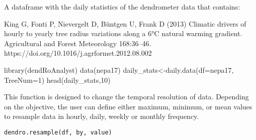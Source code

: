 \documentclass[a4paper]{book}
\begin{document}
%
\begin{Value}
A dataframe with the daily statistics of the dendrometer data that contains:

\end{Value}
%
\begin{References}\relax
King G, Fonti P, Nievergelt D, Büntgen U, Frank D (2013) Climatic drivers of hourly to yearly tree radius variations along a 6°C natural warming gradient. Agricultural and Forest Meteorology 168:36–46. https://doi.org/10.1016/j.agrformet.2012.08.002
\end{References}
%
\begin{Examples}
\begin{ExampleCode}
library(dendRoAnalyst)
data(nepa17)
daily_stats<-daily.data(df=nepa17, TreeNum=1)
head(daily_stats,10)

\end{ExampleCode}
\end{Examples}
%
\begin{Description}\relax
This function is designed to change the temporal resolution of data. Depending on the objective, the user can define either maximum, minimum, or mean values to resample data in hourly, daily, weekly or monthly frequency.
\end{Description}
%
\begin{Usage}
\begin{verbatim}
dendro.resample(df, by, value)
\end{verbatim}
\end{Usage}
\end{document}
